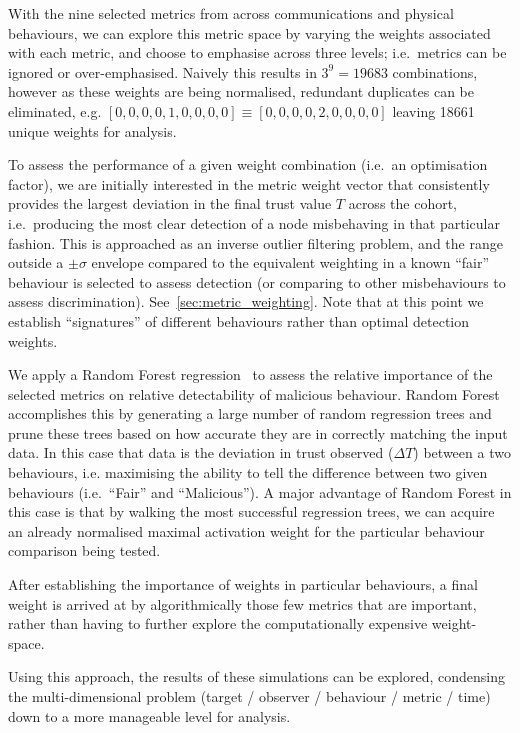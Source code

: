 With the nine selected metrics from across communications and physical behaviours, we can explore this metric space by varying the weights associated with each metric, and choose to emphasise across three levels; i.e.\ metrics can be ignored or over-emphasised. Naively this results in $3^9 = 19683$ combinations, however as these weights are being normalised, redundant duplicates can be eliminated, e.g. $[0,0,0,0,1,0,0,0,0] \equiv [0,0,0,0,2,0,0,0,0]$ leaving 18661 unique weights for analysis.

To assess the performance of a given weight combination (i.e.\ an optimisation factor), we are initially interested in the metric weight vector that consistently provides the largest deviation in the final trust value $T$ across the cohort, i.e.\ producing the most clear detection of a node misbehaving in that particular fashion.
This is approached as an inverse outlier filtering problem, and the range outside a $\pm\sigma$ envelope compared to the equivalent weighting in a known ``fair'' behaviour is selected to assess detection (or comparing to other misbehaviours to assess discrimination).
See~\autoref{sec:metric_weighting}.
Note that at this point we establish ``signatures'' of different behaviours rather than optimal detection weights.

We apply a Random Forest regression~\cite{Breiman2001} to assess the relative importance of the selected metrics on relative detectability of malicious behaviour. 
Random Forest accomplishes this by generating a large number of random regression trees and prune these trees based on how accurate they are in correctly matching the input data.
In this case that data is the deviation in trust observed ($\Delta T$) between a two behaviours, i.e. maximising the ability to tell the difference between two given behaviours (i.e.\ ``Fair'' and ``Malicious'').
A major advantage of Random Forest in this case is that by walking the most successful regression trees, we can acquire an already normalised maximal activation weight for the particular behaviour comparison being tested.

After establishing the importance of weights in particular behaviours, a final weight is arrived at by algorithmically those few metrics that are important, rather than having to further explore the computationally expensive weight-space.

Using this approach, the results of these simulations can be explored, condensing the multi-dimensional problem (target / observer / behaviour / metric / time) down to a more manageable level for analysis.

